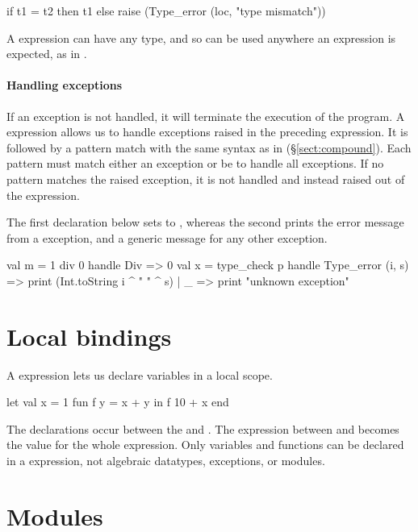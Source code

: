 \documentclass[12pt,a4paper]{book}
\begin{document}
\begin{smlcode}
if t1 = t2 then t1
else raise (Type_error (loc, "type mismatch"))
\end{smlcode}

A  expression can have any type, and so can be used anywhere
an expression is expected, as in .

\paragraph{Handling exceptions} If an exception is not handled, it will
terminate the execution of the program.  A  expression allows
us to handle exceptions raised in the preceding expression. It is followed by a
pattern match with the same syntax as in 
(\S\ref{sect:compound}). Each pattern must match either an exception or be
\smlinline{_} to handle all exceptions. If no pattern matches the raised
exception, it is not handled and instead raised out of the 
expression.

The first declaration below sets  to , whereas the second prints
the error message from a  exception, and a generic
message for any other exception.
\begin{smlcode}
val m =
  1 div 0 handle Div => 0
val x =
  type_check p
  handle
    Type_error (i, s) => print (Int.toString i ^ " " ^ s)
  | _ => print "unknown exception"
\end{smlcode}

\section{Local bindings}

A  expression lets us declare variables in a local scope.
\begin{smlcode}
let
  val x = 1
  fun f y = x + y
in
  f 10 + x
end
\end{smlcode}
The declarations occur between the  and .
The expression between  and  becomes the value
for the whole  expression. Only variables and functions can be
declared in a  expression, not algebraic datatypes, exceptions,
or modules.

\section{Modules}
\label{sect:modules}
\end{document}
